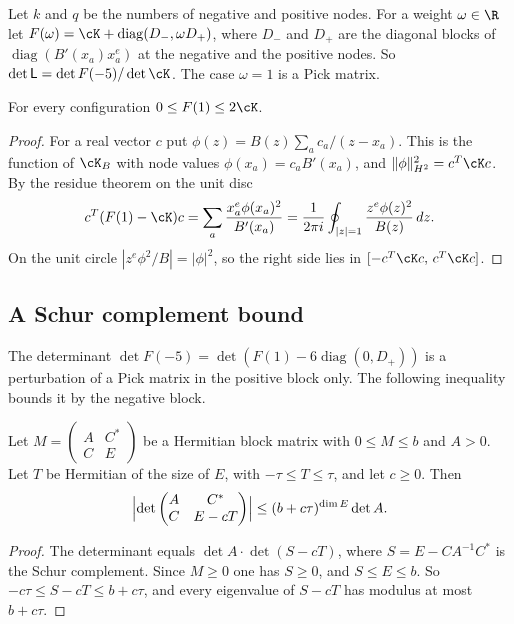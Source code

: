 Let $k$ and $q$ be the numbers of negative and positive nodes. For a weight $\omega\in\R$ let
$F(\omega)=\cK+\operatorname{diag}(D_-,\omega D_+)$, where $D_-$ and $D_+$ are the diagonal blocks of
$\operatorname{diag}(B'(x_a)x_a^e)$ at the negative and the positive nodes. So $\det\mathsf L=\det F(-5)/\det\cK$. The case $\omega=1$ is a
Pick matrix.

\begin{lemma}\label{lem:pick}
For every configuration $0\le F(1)\le2\cK$.
\end{lemma}

\begin{proof}
For a real vector $c$ put $\phi(z)=B(z)\sum_ac_a/(z-x_a)$. This is the function of $\cK_B$ with node values
$\phi(x_a)=c_aB'(x_a)$, and $\|\phi\|_{H^2}^2=c^T\cK c$. By the residue theorem on the unit disc
\[
 c^T(F(1)-\cK)c=\sum_a\frac{x_a^e\phi(x_a)^2}{B'(x_a)}=\frac1{2\pi i}\oint_{|z|=1}\frac{z^e\phi(z)^2}{B(z)}\,dz .
\]
On the unit circle $|z^e\phi^2/B|=|\phi|^2$, so the right side lies in $[-c^T\cK c,\,c^T\cK c]$.
\end{proof}

\subsection{A Schur complement bound}\label{ssec:schur}
The determinant $\det F(-5)=\det(F(1)-6\operatorname{diag}(0,D_+))$ is a perturbation of a Pick matrix in the
positive block only. The following inequality bounds it by the negative block.

\begin{theorem}\label{thm:C3}
Let $M=\begin{pmatrix}A&C^*\\C&E\end{pmatrix}$ be a Hermitian block matrix with $0\le M\le b$ and $A>0$. Let $T$
be Hermitian of the size of $E$, with $-\tau\le T\le\tau$, and let $c\ge0$. Then
\[
 \Bigl|\det\begin{pmatrix}A&C^*\\C&E-cT\end{pmatrix}\Bigr|\le(b+c\tau)^{\dim E}\det A .
\]
\end{theorem}

\begin{proof}
The determinant equals $\det A\cdot\det(S-cT)$, where $S=E-CA^{-1}C^*$ is the Schur complement. Since $M\ge0$
one has $S\ge0$, and $S\le E\le b$. So $-c\tau\le S-cT\le b+c\tau$, and every eigenvalue of $S-cT$ has modulus at
most $b+c\tau$.
\end{proof}

